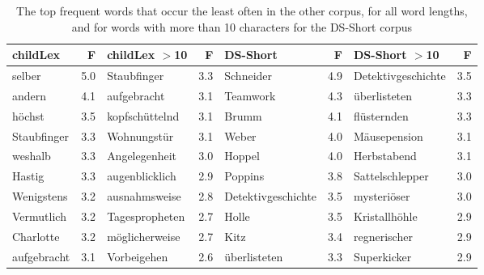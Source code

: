 \documentclass[doc, a4paper, anonymous]{apa7}
\begin{document}
\begin{table}[!htbp]
\caption{The top frequent words that occur the least often in the other corpus, for all word lengths, and for words with more than 10 characters for the DS-Short corpus}
\centering
\begin{tabular}{lrlrlrlr}
  \hline
childLex & F & childLex $>$10 & F & DS-Short & F & DS-Short $>$10 & F \\ 
  \hline
selber & 5.0 & Staubfinger & 3.3 & Schneider & 4.9 & Detektivgeschichte & 3.5 \\ 
  andern & 4.1 & aufgebracht & 3.1 & Teamwork & 4.3 & überlisteten & 3.3 \\ 
  höchst & 3.5 & kopfschüttelnd & 3.1 & Brumm & 4.1 & flüsternden & 3.3 \\ 
  Staubfinger & 3.3 & Wohnungstür & 3.1 & Weber & 4.0 & Mäusepension & 3.1 \\ 
  weshalb & 3.3 & Angelegenheit & 3.0 & Hoppel & 4.0 & Herbstabend & 3.1 \\ 
  Hastig & 3.3 & augenblicklich & 2.9 & Poppins & 3.8 & Sattelschlepper & 3.0 \\ 
  Wenigstens & 3.2 & ausnahmsweise & 2.8 & Detektivgeschichte & 3.5 & mysteriöser & 3.0 \\ 
  Vermutlich & 3.2 & Tagespropheten & 2.7 & Holle & 3.5 & Kristallhöhle & 2.9 \\ 
  Charlotte & 3.2 & möglicherweise & 2.7 & Kitz & 3.4 & regnerischer & 2.9 \\ 
  aufgebracht & 3.1 & Vorbeigehen & 2.6 & überlisteten & 3.3 & Superkicker & 2.9 \\ 
   \hline
\end{tabular}
\label{words-dssh-low}
\end{table}
\end{document}
